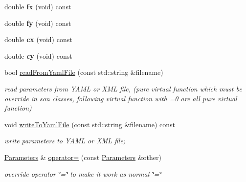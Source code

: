 \begin{DoxyCompactItemize}
double {\bfseries fx} (void) const
\item 
\mbox{\label{classcamodocal_1_1PinholeCamera_1_1Parameters_a465d8d85081520ee71c7ad543616d10e}} 
double {\bfseries fy} (void) const
\item 
\mbox{\label{classcamodocal_1_1PinholeCamera_1_1Parameters_af8871121f4a676142be4208b2a6dc279}} 
double {\bfseries cx} (void) const
\item 
\mbox{\label{classcamodocal_1_1PinholeCamera_1_1Parameters_a460344824e5910b2171f26e862cd976c}} 
double {\bfseries cy} (void) const
\item 
bool \hyperlink{classcamodocal_1_1PinholeCamera_1_1Parameters_a89d5834203e80ca6c09f60c47627c9a7}{read\+From\+Yaml\+File} (const std\+::string \&filename)
\begin{DoxyCompactList}\small\item\em read parameters from Y\+A\+ML or X\+ML file, (pure virtual function which must be override in son classes, following virtual function with \textquotesingle{}=0\textquotesingle{} are all pure virtual function) \end{DoxyCompactList}\item 
void \hyperlink{classcamodocal_1_1PinholeCamera_1_1Parameters_ace74203c61ef30b57a2ba21184070bb5}{write\+To\+Yaml\+File} (const std\+::string \&filename) const
\begin{DoxyCompactList}\small\item\em write parameters to Y\+A\+ML or X\+ML file; \end{DoxyCompactList}\item 
\hyperlink{classcamodocal_1_1PinholeCamera_1_1Parameters}{Parameters} \& \hyperlink{classcamodocal_1_1PinholeCamera_1_1Parameters_a9a13d3d054304a31cb96e75c65a806c4}{operator=} (const \hyperlink{classcamodocal_1_1PinholeCamera_1_1Parameters}{Parameters} \&other)
\begin{DoxyCompactList}\small\item\em override operator \char`\"{}=\char`\"{} to make it work as normal \char`\"{}=\char`\"{} \end{DoxyCompactList}\end{DoxyCompactItemize}
